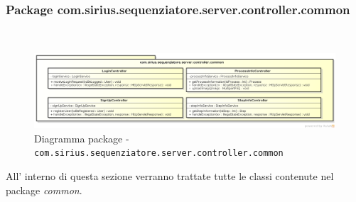 \subsubsection{Package com.sirius.sequenziatore.server.controller.common}
\
\begin{figure}[H] \centering \includegraphics[width=%
\textwidth]
{./classi/server/controllercommon.png} \caption{Diagramma package - \texttt{com.sirius.sequenziatore.server.controller.common}}
\end{figure}
All' interno di questa sezione verranno trattate tutte le classi contenute nel package \textit{common}.
